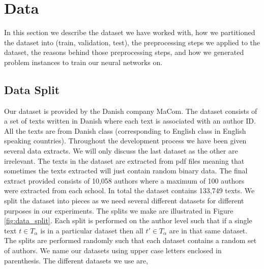 \section{Data} \label{sec:data}

In this section we describe the dataset we have worked with, how we partitioned
the dataset into (train, validation, test), the preprocessing steps we applied
to the dataset, the reasons behind those preprocessing steps, and how we
generated problem instances to train our neural networks on.


\subsection{Data Split}

Our dataset is provided by the Danish company MaCom. The dataset consists of a
set of texts written in Danish where each text is associated with an author ID.
All the texts are from Danish class (corresponding to English class in English
speaking countries). Throughout the development process we have been given
several data extracts. We will only discuss the last dataset as the other are
irrelevant. The texts in the dataset are extracted from pdf files meaning that
sometimes the texts extracted will just contain random binary data. The final
extract provided consists of 10,058 authors where a maximum of 100 authors
were extracted from each school. In total the dataset contains 133,749 texts.
We split the dataset into pieces as we need several different datasets for
different purposes in our experiments. The splits we make are illustrated in
Figure \ref{fig:data_split}. Each split is performed on the author level such
that if a single text $t \in T_\alpha$ is in a particular dataset then all $t'
\in T_\alpha$ are in that same dataset. The splits are performed randomly such
that each dataset contains a random set of authors. We name our datasets using
upper case letters enclosed in parenthesis. The different datasets we use are,

